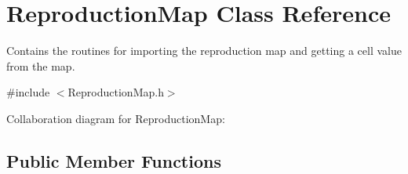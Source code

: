 \hypertarget{class_reproduction_map}{}\section{Reproduction\+Map Class Reference}
\label{class_reproduction_map}


Contains the routines for importing the reproduction map and getting a cell value from the map.  




{\ttfamily \#include $<$Reproduction\+Map.\+h$>$}



Collaboration diagram for Reproduction\+Map\+:
\subsection*{Public Member Functions}
